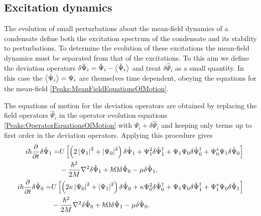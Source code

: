 \subsection{Excitation dynamics}

The evolution of small perturbations about the mean-field dynamics of a condensate define both the excitation spectrum of the condensate and its stability to perturbations. 
To determine the evolution of these excitations the mean-field dynamics must be separated from that of the excitations. To this aim we define the deviation operators $\delta\hat{\Psi}_i = \hat{\Psi}_i - {\big<\hat{\Psi}_i\big>}$ and treat $\delta\hat{\Psi}_i$ as a small quantity. In this case the ${\big<\hat{\Psi}_i\big>}=\Psi_i$ are themselves time dependent, obeying the equations for the mean-field \eqref{Peaks:MeanFieldEquationsOfMotion}.

The equations of motion for the deviation operators are obtained by replacing the field operators $\hat{\Psi}_i$ in the operator evolution equations \eqref{Peaks:OperatorEquationsOfMotion} with $\Psi_i + \delta \hat{\Psi}_i$ and keeping only terms up to first order in the deviation operators. Applying this procedure gives
\begin{subequations}
    \label{Peaks:DeviationOperatorsEvolutionXSpace}
    \begin{align}
        \begin{split}
            i \hbar \frac{\partial }{\partial t}\delta \hat{\Psi}_1 =& U\left[ \left(2\abs{\Psi_1}^2+\abs{\Psi_0}^2 \right)\delta \hat{\Psi}_1 + \Psi_1^2\delta\hat{\Psi}_1^\dagger + \Psi_1\Psi_0\delta\hat{\Psi}_0^\dagger + \Psi_0^*\Psi_1\delta\hat{\Psi}_0\right]\\
                    & - \frac{\hbar^2}{2M}\nabla^2 \delta \hat{\Psi}_1 +\hbar \Omega\delta\hat{\Psi}_0- \mu \delta \hat{\Psi}_1,
        \end{split}\\
        \begin{split}
        i \hbar \frac{\partial }{\partial t}\delta \hat{\Psi}_0 =& U\left[\left(2\kappa \abs{\Psi_0}^2 +\abs{\Psi_1}^2\right)\delta\hat{\Psi}_0 + \kappa \Psi_0^2 \delta\hat{\Psi}_0^\dagger + \Psi_1\Psi_0\delta\hat{\Psi}_1^\dagger + \Psi_1^*\Psi_0\delta\hat{\Psi}_1\right]\\
                    & -\frac{\hbar^2}{2M}\nabla^2 \delta \hat{\Psi}_0 +\hbar \Omega\delta\hat{\Psi}_1 - \mu \delta\hat{\Psi}_0.
        \end{split}
    \end{align}
\end{subequations}

